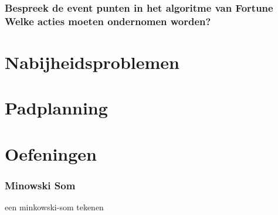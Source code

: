 \documentclass[12pt,a4paper]{article}
\begin{document}
\section{Bespreek de event punten in het algoritme van Fortune Welke acties moeten ondernomen worden?}
\fi

\part{Nabijheidsproblemen}
\iffalse
\section{wat betekent volgende uitspraak: probleem A is ?(N) transformeerbaar tot probleem B? waarvoor kan een dergelijke uitspraak nuttig gebruikt worden + vb}
\section{wat is een EMDB van een vz punten + verband met Voronoi diagramma van een vz punten?}
\section{bespreek beknopt hoe een EMDB van een vz punten kan berkend worden in O(nlogn) bewerkingen}
\fi

\part{Padplanning}
\iffalse
\section{Hoe bepaal je het gebied dat kan bereikt worden door een robotarm met 3 segmenten. Is de volgorde van de stukken belangrijk?}
\section{Geef en bespreek de minkovski-som met een voorbeeld.}
\fi
\fi

\part{Oefeningen}




\iffalse
\section{Minowski Som}
een minkowski-som tekenen 
\end{document}
